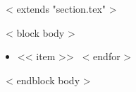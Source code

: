~< extends "section.tex" >~

~< block body >~
    \begin{itemize}
      ~< for item in items >~
            \item << item >>
      ~< endfor >~
    \end{itemize}
~< endblock body >~
